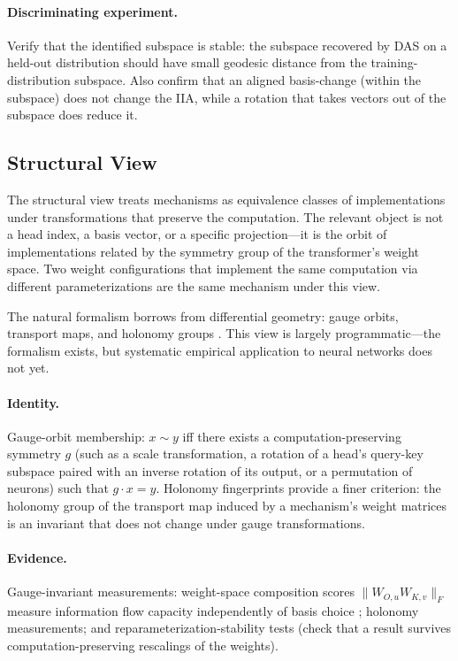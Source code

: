 \documentclass{article}
\begin{document}
\paragraph{Discriminating experiment.}
Verify that the identified subspace is stable: the subspace recovered
by DAS on a held-out distribution should have small geodesic distance
from the training-distribution subspace.  Also confirm that
an aligned basis-change (within the subspace) does not change the IIA,
while a rotation that takes vectors out of the subspace does reduce it.

\subsection{Structural View}

The structural view treats mechanisms as equivalence classes of
implementations under transformations that preserve the computation.
The relevant object is not a head index, a basis vector, or a specific
projection---it is the orbit of implementations related by the symmetry
group of the transformer's weight space.  Two weight configurations
that implement the same computation via different parameterizations are
the same mechanism under this view.

The natural formalism borrows from differential geometry:
gauge orbits, transport maps, and holonomy groups
\citep{nakahara2003}.  This view is largely programmatic---the
formalism exists, but systematic empirical application to neural
networks does not yet.

\paragraph{Identity.}
Gauge-orbit membership: $x \sim y$ iff there exists a computation-preserving
symmetry $g$ (such as a scale transformation, a rotation of a head's
query-key subspace paired with an inverse rotation of its output, or a
permutation of neurons) such that $g \cdot x = y$.  Holonomy fingerprints
provide a finer criterion: the holonomy group of the transport map
induced by a mechanism's weight matrices is an invariant that does not
change under gauge transformations.

\paragraph{Evidence.}
Gauge-invariant measurements: weight-space composition scores
$\|W_{O,u} W_{K,v}\|_F$ measure information flow capacity independently
of basis choice \citep{elhage2021,merullo2024}; holonomy measurements; and
reparameterization-stability tests (check that a result survives
computation-preserving rescalings of the weights).
\end{document}
